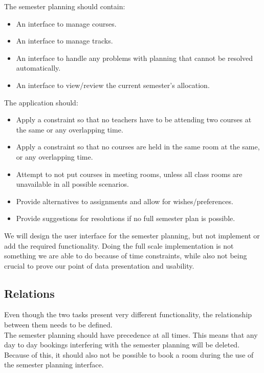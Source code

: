 The semester planning should contain:

\begin{itemize}
	\item An interface to manage courses.
	\item An interface to manage tracks.
	\item An interface to handle any problems with planning that cannot be resolved automatically.
	\item An interface to view/review the current semester's allocation.
\end{itemize}

The application should:

\begin{itemize}
	\item Apply a constraint so that no teachers have to be attending two courses at the same or any overlapping time.
	\item Apply a constraint so that no courses are held in the same room at the same, or any overlapping time.
	\item Attempt to not put courses in meeting rooms, unless all class rooms are unavailable in all possible scenarios.
	\item Provide alternatives to assignments and allow for wishes/preferences.
	\item Provide suggestions for resolutions if no full semester plan is possible.
\end{itemize}


We will design the user interface for the semester planning, but not implement or add the required functionality. Doing the full scale implementation is not something we are able to do because of time constraints, while also not being crucial to prove our point of data presentation and usability.

\subsection{Relations}
\label{subsec:relations}
Even though the two tasks present very different functionality, the relationship between them needs to be defined.\\

The semester planning should have precedence at all times. This means that any day to day bookings interfering with the semester planning will be deleted. Because of this, it should also not be possible to book a room during the use of the semester planning interface. \\

